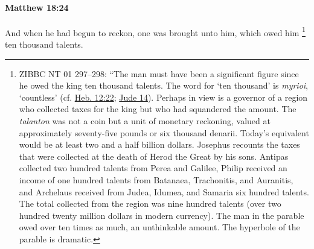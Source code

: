 			\begin{framed}
			\scriptsize
				\begin{compactdesc}
					\item[SBLG] 
				\end{compactdesc}
			\end{framed}

		\paragraph{Matthew 18:24} %
			\label{MATTHEW-18-24}

			And when he had begun to reckon, one was brought unto him, which owed him 
				\footnote{%
					ZIBBC NT 01 297--298: ``The man must have been a significant figure since he owed the king ten thousand talents. The word for `ten thousand' is \textit{myrioi}, `countless' (cf. \hyperref[HEBREWS-12-22]{Heb. 12:22}; \hyperref[JUDE-1-14]{Jude 14}). Perhaps in view is a governor of a region who collected taxes for the king but who had squandered the amount. The \textit{talanton} was not a coin but a unit of monetary reckoning, valued at approximately seventy-five pounds or six thousand denarii. Today's equivalent would be at least two and a half billion dollars. Josephus recounts the taxes that were collected at the death of Herod the Great by his sons. Antipas collected two hundred talents from Perea and Galilee, Philip received an income of one hundred talents from Batanaea, Trachonitis, and Auranitis, and Archelaus received from Judea, Idumea, and Samaria six hundred talents. The total collected from the region was nine hundred talents (over two hundred twenty million dollars in modern currency). The man in the parable owed over ten times as much, an unthinkable amount. The hyperbole of the parable is dramatic. 
					}%
			ten thousand talents.

